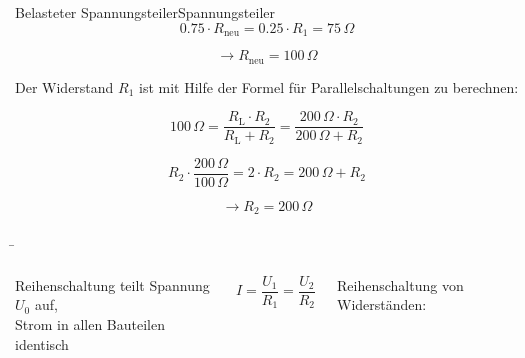 \begin{frame}
{\begin{bsp}{Belasteter Spannungsteiler}{Spannungsteiler}
			\begin{equation*}
				0.75 \cdot R_\mathrm{neu} = 0.25 \cdot R_1 = 75 \, \Omega
			\end{equation*}
			
			\begin{equation*}
				\rightarrow R_\mathrm{neu} = 100 \, \Omega
			\end{equation*}
			
			Der Widerstand $R_1$ ist mit Hilfe der Formel für Parallelschaltungen zu berechnen:
			
			\begin{equation*}
				100 \, \Omega = \frac{R_\mathrm{L} \cdot R_2}{R_\mathrm{L} + R_2} = \frac{200 \, \Omega \cdot R_2}{200 \, \Omega + R_2}
			\end{equation*}
			
			\begin{equation}
				R_2 \cdot \frac{200 \, \Omega}{100 \, \Omega} = 2 \cdot R_2 = 200 \, \Omega + R_2
			\end{equation}
			
			\begin{equation*}
				\rightarrow R_2 = 200 \, \Omega
			\end{equation*}
			
			
			
		\end{bsp}
		
		
		
	}
	
	
	
	\b{
		
		\begin{columns}
			
			
			Reihenschaltung teilt Spannung $U_0$ auf,\\
			Strom in allen Bauteilen identisch
			
			\begin{equation*}
				I = \frac{U_1}{R_1} = \frac{U_2}{R_2}
			\end{equation*}
			
			
			
			
			
			Reihenschaltung von Widerständen:
			

\end{columns}}
\end{frame}
